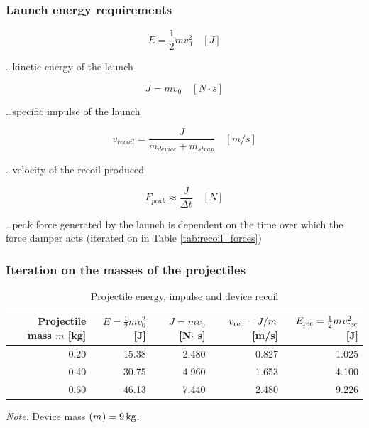 \documentclass[a4paper,10pt]{article} %
\begin{document}
\subsubsection{Launch energy requirements}

\begin{equation}
    E = \frac{1}{2}mv^2_0 \quad [J]
\end{equation}

\ldots kinetic energy of the launch

\begin{equation}
    J = mv_0 \quad [N \cdot s]
\label{eqn:impulse}
\end{equation}

\ldots specific impulse of the launch

\begin{equation}
    v_{recoil} = \frac{J}{m_{device}+m_{strap}} \quad [m/s]
\end{equation}

\ldots velocity of the recoil produced

\begin{equation}
    F_{peak} \approx \frac{J}{\Delta t} \quad [N]
    \label{eqn:fpeak}
\end{equation}

\ldots peak force generated by the launch is dependent on the time over which the force damper acts (iterated on in Table \ref{tab:recoil_forces})

\subsubsection{Iteration on the masses of the projectiles}


\begin{table}[ht]
\centering
\caption{Projectile energy, impulse and device recoil}
\label{tab:proj_energy_recoil}
\begin{tabular}{@{}rrrrr@{}}
\toprule
Projectile mass $m$ [kg] & $E=\tfrac12 m v_0^2$ [J] & $J=m v_0$ [N$\cdot$ s] & {$v_{\rm rec}=J/m_{\rm}$ [m/s]} & $E_{\rm rec}=\tfrac12 m_{\rm} v_{\rm rec}^2$ [J] \\
\midrule
0.20 & 15.38 & 2.480 & 0.827 & 1.025 \\
0.40 & 30.75 & 4.960 & 1.653 & 4.100 \\
0.60 & 46.13 & 7.440 & 2.480 & 9.226 \\
\bottomrule
\end{tabular}
\begin{tablenotes}[flushleft]
\footnotesize
\textit{Note}. Device mass $(m_{\rm}) = 9\,\mathrm{kg}$.
\end{tablenotes}
\end{table}
\end{document}
